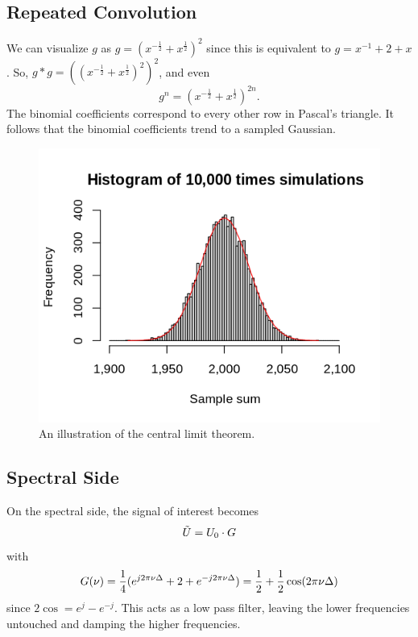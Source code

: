 \documentclass[11pt]{article}
\begin{document}
\subsection{Repeated Convolution}
We can visualize $g$ as $g = (x^{-\frac{1}{2}} + x^{\frac{1}{2}})^2$ since this is equivalent to $g = x^{-1} + 2 + x$.
So, $g * g = ((x^{-\frac{1}{2}} + x^{\frac{1}{2}})^2)^2$, and even
\begin{equation}
    g^n = (x^{-\frac{1}{2}} + x^{\frac{1}{2}})^{2n}.
\end{equation}
The binomial coefficients correspond to every other row in Pascal's triangle.
It follows that the binomial coefficients trend to a sampled Gaussian.
\begin{figure}
    \centering
    \includegraphics[scale=0.5]{figures/lecture04/central_limit_theorem.png}
    \caption{An illustration of the central limit theorem. \cite{wiki_1_2022}}
    \label{fig:Binomial Coefficients}
\end{figure}

\subsection{Spectral Side}
On the spectral side, the signal of interest becomes
\begin{equation}
    \Tilde{U} = U_0 \cdot G
\end{equation}
with 
\begin{equation}
    G(\nu) = \frac{1}{4}(e^{j2 \pi \nu \Delta} + 2 + e^{-j2 \pi \nu \Delta}) \\
        = \frac{1}{2} + \frac{1}{2}\cos (2 \pi \nu \Delta) 
\end{equation}
since $2\cos = e^j - e^{-j}$.
This acts as a low pass filter, leaving the lower frequencies untouched and damping the higher frequencies.
\end{document}
